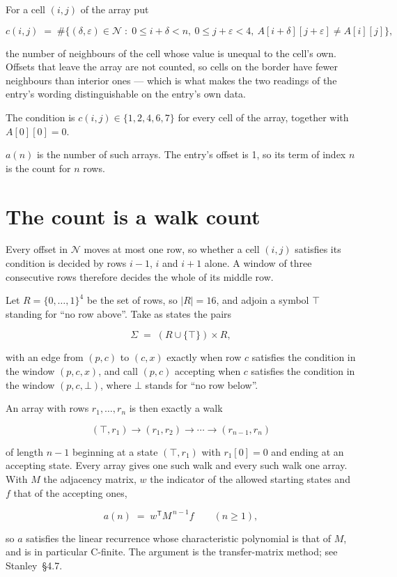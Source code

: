 \documentclass[11pt]{article}
\theoremstyle{definition}
\begin{document}
For a cell $(i,j)$ of the array put

\[c(i,j) \;=\; \#\bigl\{(\delta,\varepsilon)\in\mathcal{N} \;:\; 0\le i+\delta<n,\ 0\le j+\varepsilon<4,\ A[i+\delta][j+\varepsilon] \neq A[i][j]\bigr\},\]

the number of neighbours of the cell whose value is unequal to the cell's own. Offsets that leave the array are not counted, so cells on the border have fewer neighbours than interior ones --- which is what makes the two readings of the entry's wording distinguishable on the entry's own data.

The condition is $c(i,j) \in \{1, 2, 4, 6, 7\}$ for every cell of the array, together with $A[0][0]=0$.

$a(n)$ is the number of such arrays. The entry's offset is 1, so its term of index $n$ is the count for $n$ rows.

\section{The count is a walk count}

Every offset in $\mathcal{N}$ moves at most one row, so whether a cell $(i,j)$ satisfies its condition is decided by rows $i-1$, $i$ and $i+1$ alone. A window of three consecutive rows therefore decides the whole of its middle row.

Let $R = \{0,\dots,1\}^{4}$ be the set of rows, so $|R| = 16$, and adjoin a symbol $\top$ standing for ``no row above''. Take as states the pairs

\[\Sigma \;=\; (R \cup \{\top\}) \times R,\]

with an edge from $(p,c)$ to $(c,x)$ exactly when row $c$ satisfies the condition in the window $(p,c,x)$, and call $(p,c)$ accepting when $c$ satisfies the condition in the window $(p,c,\bot)$, where $\bot$ stands for ``no row below''.

An array with rows $r_1,\dots,r_n$ is then exactly a walk

\[(\top,r_1) \to (r_1,r_2) \to \cdots \to (r_{n-1},r_n)\]

of length $n-1$ beginning at a state $(\top,r_1)$ with $r_1[0]=0$ and ending at an accepting state. Every array gives one such walk and every such walk one array. With $M$ the adjacency matrix, $w$ the indicator of the allowed starting states and $f$ that of the accepting ones,

\[a(n) \;=\; w^{\mathsf T} M^{\,n-1} f \qquad (n \ge 1),\]

so $a$ satisfies the linear recurrence whose characteristic polynomial is that of $M$, and is in particular C-finite. The argument is the transfer-matrix method; see Stanley~\S4.7.
\end{document}
